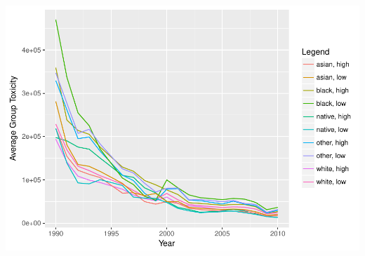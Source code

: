 \documentclass[12pt,twoside]{dukestatscithesis}
\theoremstyle{definition}
\theoremstyle{definition}
\theoremstyle{definition}
\theoremstyle{remark}
\begin{document}
\includegraphics{thesis_files/figure-latex/unnamed-chunk-4-9.pdf}
\end{document}
